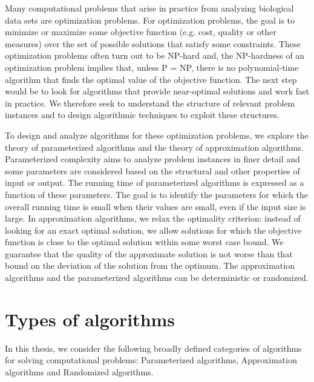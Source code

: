 Many computational problems that arise in practice from analyzing biological data sets are optimization problems.
For optimization problems, the goal is to minimize or maximize some objective function (e.g. cost, quality or other measures) over the set of possible solutions that satisfy some constraints.
These optimization problems often turn out to be NP-hard and, the
NP-hardness of an optimization problem implies that, unless P = NP, there is no polynomial-time algorithm
that finds the optimal value of the objective function. 
The next step would be to look for algorithms that provide near-optimal solutions and work fast in practice.
We therefore seek to understand the structure of relevant problem instances and to design algorithmic
techniques to exploit these structures.

To design and analyze algorithms for these optimization problems, we explore the theory of parameterized algorithms and the theory of approximation algorithms.
Parameterized complexity aims to analyze problem instances in finer detail and some parameters are considered based on the structural and other properties of input or output.
The running time of parameterized algorithms is expressed as a function of these parameters. 
The goal is to identify the parameters for which the overall running time is small when their values are small, even if the input size is large. 
In approximation algorithms, we relax the optimality criterion: instead of looking for an exact optimal solution,
we allow solutions for which the objective function is close to the optimal solution within some worst case bound.
We guarantee that the quality of the approximate solution is not worse than that bound on the deviation of the solution from the optimum.
The approximation algorithms and the parameterized algorithms can be deterministic or randomized.


\section{Types of algorithms}
In this thesis, we consider the following broadly defined categories of algorithms for solving computational problems: Parameterized algorithms, Approximation algorithms and Randomized algorithms.

